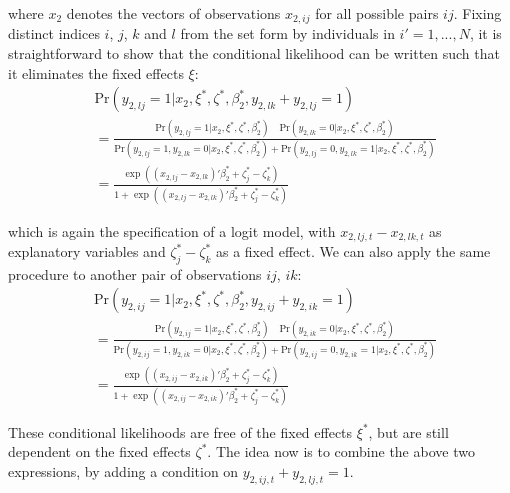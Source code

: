 \noindent where $x_{2}$ denotes the vectors of observations $x_{2,ij}$ for all possible pairs $ij$. Fixing distinct indices $i$, $j$, $k$ and $l$ from the set form by individuals in $i'=1,...,N$, it is straightforward to show that the conditional likelihood can be written such that it eliminates the fixed effects $\xi$:
\begin{align*}
    &\text{Pr}(y_{2,lj} = 1 \rvert x_{2}, \xi^*, \zeta^*, \beta_2^*, y_{2,lk} + y_{2,lj} = 1) \\
    &=\frac{\text{Pr} (y_{2,lj} = 1 \rvert x_{2}, \xi^*, \zeta^*, \beta_2^*) \quad \text{Pr} (y_{2,lk} = 0 \rvert x_{2}, \xi^*, \zeta^*, \beta_2^*)}{\text{Pr} (y_{2,lj} = 1, y_{2,lk} = 0 \rvert x_{2}, \xi^*, \zeta^*, \beta_2^*) + \text{Pr} (y_{2,lj} = 0, y_{2,lk} = 1 \rvert x_{2}, \xi^*, \zeta^*, \beta_2^*)} \\
    &= \frac{\exp((x_{2,lj} - x_{2,lk})'\beta_2^* + \zeta_j^* - \zeta_k^*)}{1 + \exp((x_{2,lj} - x_{2,lk})'\beta_2^* + \zeta_j^* - \zeta_k^*)}
\end{align*}

\noindent which is again the specification of a logit model, with $x_{2,lj,t} - x_{2,lk,t}$ as explanatory variables and $\zeta_j^* - \zeta_k^*$ as a fixed effect. We can also apply the same procedure to another pair of observations $ij$, $ik$:
\begin{align*}
    &\text{Pr}(y_{2,ij} = 1 \rvert x_2, \xi^*, \zeta^*, \beta_2^*, y_{2,ij} + y_{2,ik} = 1) \\
    &=\frac{\text{Pr} (y_{2,ij} = 1 \rvert x_2, \xi^*, \zeta^*, \beta_2^*) \quad \text{Pr} (y_{2,ik} = 0 \rvert x_2, \xi^*, \zeta^*, \beta_2^*)}{\text{Pr} (y_{2,ij} = 1, y_{2,ik} = 0 \rvert x_2, \xi^*, \zeta^*, \beta_2^*) + \text{Pr} (y_{2,ij} = 0, y_{2,ik} = 1 \rvert x_2, \xi^*, \zeta^*, \beta_2^*)} \\
    &= \frac{\exp((x_{2,ij} - x_{2,ik})'\beta_2^* + \zeta_j^* - \zeta_k^*)}{1 + \exp((x_{2,ij} - x_{2,ik})'\beta_2^* + \zeta_j^* - \zeta_k^*)}
\end{align*}

These conditional likelihoods are free of the fixed effects $\xi^*$, but are still dependent on the fixed effects $\zeta^*$. The idea now is to combine the above two expressions, by adding a condition on $y_{2,ij,t} + y_{2,lj,t} = 1$.

